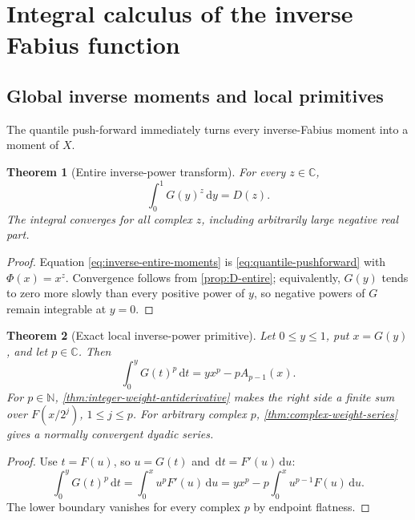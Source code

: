 \documentclass[11pt,oneside]{article}
\newtheorem{theorem}{Theorem}[section]
\theoremstyle{definition}
\theoremstyle{remark}
\newcommand{\C}{\mathbb C}
\newcommand{\N}{\mathbb N}
\newcommand{\dd}{\,\mathrm d}
\begin{document}
\section{Integral calculus of the inverse Fabius function}

\subsection{Global inverse moments and local primitives}

The quantile push-forward immediately turns every inverse-Fabius moment into a moment of $X$.

\begin{theorem}[Entire inverse-power transform]\label{thm:inverse-entire-moments}
For every $z\in\C$,
\begin{equation}\label{eq:inverse-entire-moments}
 \int_0^1G(y)^z\dd y=D(z).
\end{equation}
The integral converges for all complex $z$, including arbitrarily large negative real part.
\end{theorem}

\begin{proof}
Equation \eqref{eq:inverse-entire-moments} is \eqref{eq:quantile-pushforward} with $\Phi(x)=x^z$.  Convergence follows from \cref{prop:D-entire}; equivalently, $G(y)$ tends to zero more slowly than every positive power of $y$, so negative powers of $G$ remain integrable at $y=0$.
\end{proof}

\begin{theorem}[Exact local inverse-power primitive]\label{thm:inverse-local-primitive}
Let $0\le y\le1$, put $x=G(y)$, and let $p\in\C$.  Then
\begin{equation}\label{eq:inverse-local-primitive}
\boxed{
 \int_0^yG(t)^p\dd t
 =y x^p-pA_{p-1}(x).}
\end{equation}
For $p\in\N$, \cref{thm:integer-weight-antiderivative} makes the right side a finite sum over $F(x/2^j)$, $1\le j\le p$.  For arbitrary complex $p$, \cref{thm:complex-weight-series} gives a normally convergent dyadic series.
\end{theorem}

\begin{proof}
Use $t=F(u)$, so $u=G(t)$ and $\dd t=F'(u)\dd u$:
\[
 \int_0^yG(t)^p\dd t
 =\int_0^xu^pF'(u)\dd u
 =yx^p-p\int_0^xu^{p-1}F(u)\dd u.
\]
The lower boundary vanishes for every complex $p$ by endpoint flatness.
\end{proof}
\end{document}
